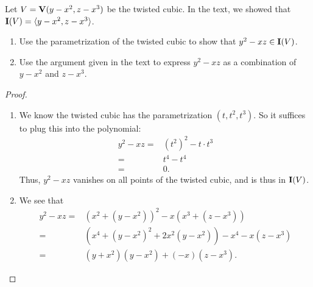 \begin{exercise}{9}
Let $V = \mathbf{V}(y-x^2, z-x^3)$ be the twisted cubic. 
In the text, we showed that $\mathbf{I}(V) = \langle y-x^2, z-x^3\rangle$.
\begin{enumerate}
    \item Use the parametrization of the twisted cubic to show that $y^2 - xz\in \mathbf{I}(V)$.
    \item Use the argument given in the text to express $y^2 - xz$ as a combination of $y-x^2$ and $z-x^3$.
\end{enumerate}
\end{exercise}
\begin{proof}
    \begin{enumerate}
        \item We know the twisted cubic has the parametrization $(t,t^2,t^3)$. 
        So it suffices to plug this into the polynomial:
        \begin{align*}
            y^2 - xz
            = & (t^2)^2 - t\cdot t^3\\
            = & t^4 - t^4\\
            = & 0.
        \end{align*}
        Thus, $y^2 - xz$ vanishes on all points of the twisted cubic, and is thus in $\mathbf{I}(V)$.
        \item We see that
        \begin{align*}
            y^2 - xz
            = & (x^2 + (y-x^2))^2 - x(x^3 + (z-x^3))\\
            = & (x^4 + (y-x^2)^2 + 2x^2(y-x^2) ) - x^4 - x(z-x^3)\\
            = & (y+x^2)(y-x^2) + (-x)(z-x^3).
        \end{align*}
    \end{enumerate}
\end{proof}

